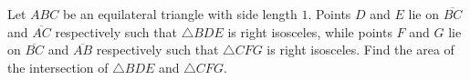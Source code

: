Let $A B C$ be an equilateral triangle with side length $1$. Points $D$ and $E$ lie on $\overline{B C}$ and $\overline{A C}$ respectively such that $\triangle B D E$ is right isosceles, while points $F$ and $G$ lie on $\overline{B C}$ and $\overline{A B}$ respectively such that $\triangle C F G$ is right isosceles. Find the area of the intersection of $\triangle B D E$ and $\triangle C F G$.